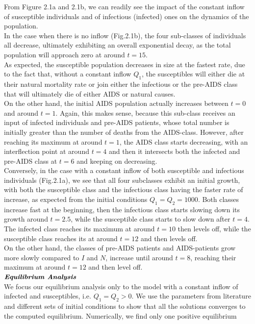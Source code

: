 From Figure 2.1a and 2.1b, we can readily see the impact of the constant inflow of susceptible individuals and of infectious (infected) ones on the dynamics of the population.\\
In the case when there is no inflow (Fig.2.1b), the four sub-classes of individuals all decrease, ultimately exhibiting an overall exponential decay, as the total population will approach zero at around $t=15$.\\
As expected, the susceptible population decreases in size at the fastest rate, due to the fact that, without a constant inflow $Q_{1}$, the susceptibles will either die at their natural mortality rate or join either the infectious or the pre-AIDS class that will ultimately die of either AIDS or natural causes. \\
On the other hand, the initial AIDS population actually increases between $t=0$ and around $t=1$. Again, this makes sense, because this sub-class receives an input of infected individuals and pre-AIDS patients, whose total number is initially greater than the number of deaths from the AIDS-class. However, after reaching its maximum at around $t=1$, the AIDS class starts decreasing, with an interflection point at around $t=4$ and then it intersects both the infected and pre-AIDS class at $t=6$ and keeping on decreasing.\\

Conversely, in the case with a constant inflow of both susceptible and infectious individuals (Fig.2.1a), we see that all four subclasses exhibit an initial growth, with both the susceptible class and the infectious class having the faster rate of increase, as expected from the initial conditions $Q_{1}=Q_{2}=1000$. Both classes increase fast at the beginning, then the infectious class starts slowing down its growth around $t=2.5$, while the susceptible class starts to slow down after $t=4$. The infected class reaches its maximum at around $t=10$ then levels off, while the susceptible class reaches its at around $t=12$ and then levels off. \\
On the other hand, the classes of pre-AIDS patients and AIDS-patients grow more slowly compared to $I$ and $N$, increase until around $t=8$, reaching their maximum at around $t=12$ and then level off.\\

$\textbf{\emph{Equilibrium Analysis}}$\\

We focus our equilibrium analysis only to the model with a constant inflow of infected and susceptibles, i.e. $Q_{1}=Q_{2} > 0$. We use the parameters from literature and different sets of initial conditions to show that all the solutions converges to the computed equilibrium. Numerically, we find only one positive equilibrium\\

